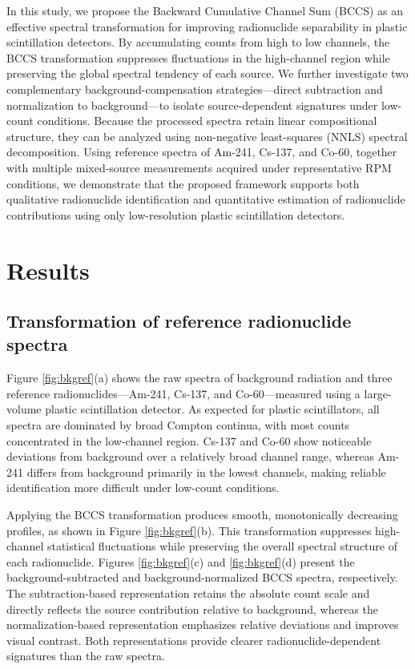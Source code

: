 \documentclass[fleqn, 10pt]{wlscirep}
\begin{document}
In this study, we propose the Backward Cumulative Channel Sum (BCCS) as an effective spectral transformation for improving radionuclide separability in plastic scintillation detectors. By accumulating counts from high to low channels, the BCCS transformation suppresses fluctuations in the high-channel region while preserving the global spectral tendency of each source. We further investigate two complementary background-compensation strategies—direct subtraction and normalization to background—to isolate source-dependent signatures under low-count conditions. Because the processed spectra retain linear compositional structure, they can be analyzed using non-negative least-squares (NNLS) spectral decomposition. Using reference spectra of Am-241, Cs-137, and Co-60, together with multiple mixed-source measurements acquired under representative RPM conditions, we demonstrate that the proposed framework supports both qualitative radionuclide identification and quantitative estimation of radionuclide contributions using only low-resolution plastic scintillation detectors.

\section*{Results}

\subsection*{Transformation of reference radionuclide spectra}

Figure \ref{fig:bkgref}(a) shows the raw spectra of background radiation and three reference radionuclides---Am-241, Cs-137, and Co-60---measured using a large-volume plastic scintillation detector. As expected for plastic scintillators, all spectra are dominated by broad Compton continua, with most counts concentrated in the low-channel region. Cs-137 and Co-60 show noticeable deviations from background over a relatively broad channel range, whereas Am-241 differs from background primarily in the lowest channels, making reliable identification more difficult under low-count conditions.

Applying the BCCS transformation produces smooth, monotonically decreasing profiles, as shown in Figure \ref{fig:bkgref}(b). This transformation suppresses high-channel statistical fluctuations while preserving the overall spectral structure of each radionuclide. Figures \ref{fig:bkgref}(c) and \ref{fig:bkgref}(d) present the background-subtracted and background-normalized BCCS spectra, respectively. The subtraction-based representation retains the absolute count scale and directly reflects the source contribution relative to background, whereas the normalization-based representation emphasizes relative deviations and improves visual contrast. Both representations provide clearer radionuclide-dependent signatures than the raw spectra.
\end{document}
